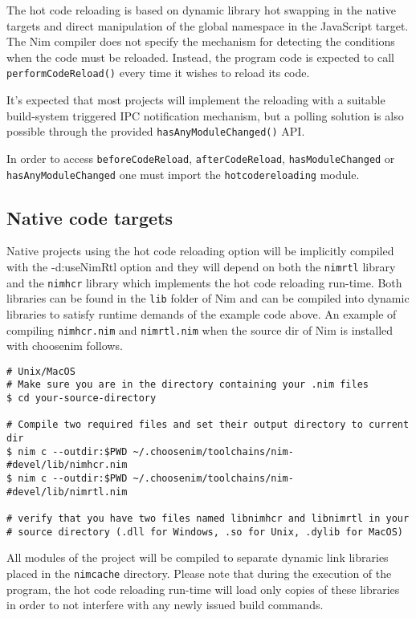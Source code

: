 The hot code reloading is based on dynamic library hot swapping in the
native targets and direct manipulation of the global namespace in the
JavaScript target. The Nim compiler does not specify the mechanism for
detecting the conditions when the code must be reloaded. Instead, the
program code is expected to call \texttt{performCodeReload()} every time
it wishes to reload its code.

It's expected that most projects will implement the reloading with a
suitable build-system triggered IPC notification mechanism, but a
polling solution is also possible through the provided
\texttt{hasAnyModuleChanged()} API.

In order to access \texttt{beforeCodeReload}, \texttt{afterCodeReload},
\texttt{hasModuleChanged} or \texttt{hasAnyModuleChanged} one must
import the \texttt{hotcodereloading} module.

\hypertarget{native-code-targets}{%
\subsection{Native code targets}\label{native-code-targets}}

Native projects using the hot code reloading option will be implicitly
compiled with the {-d:useNimRtl} option and they will depend on both the
\texttt{nimrtl} library and the \texttt{nimhcr} library which implements
the hot code reloading run-time. Both libraries can be found in the
\texttt{lib} folder of Nim and can be compiled into dynamic libraries to
satisfy runtime demands of the example code above. An example of
compiling \texttt{nimhcr.nim} and \texttt{nimrtl.nim} when the source
dir of Nim is installed with choosenim follows.

\begin{verbatim}
# Unix/MacOS
# Make sure you are in the directory containing your .nim files
$ cd your-source-directory

# Compile two required files and set their output directory to current dir
$ nim c --outdir:$PWD ~/.choosenim/toolchains/nim-#devel/lib/nimhcr.nim
$ nim c --outdir:$PWD ~/.choosenim/toolchains/nim-#devel/lib/nimrtl.nim

# verify that you have two files named libnimhcr and libnimrtl in your
# source directory (.dll for Windows, .so for Unix, .dylib for MacOS)
\end{verbatim}

All modules of the project will be compiled to separate dynamic link
libraries placed in the \texttt{nimcache} directory. Please note that
during the execution of the program, the hot code reloading run-time
will load only copies of these libraries in order to not interfere with
any newly issued build commands.


